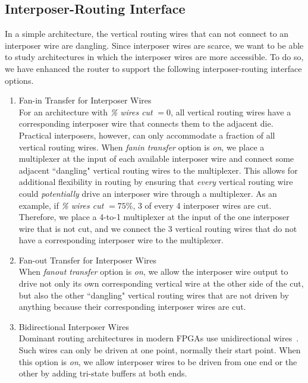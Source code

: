 \documentclass[journal]{IEEEtran}
\begin{document}
\subsection{Interposer-Routing Interface}
\label{sec:interposer-routing-interface}
In a simple architecture, the vertical routing wires that can not connect to an interposer wire are dangling. Since interposer wires are scarce, we want to be able to study architectures in which the interposer wires are more accessible. To do so, we have enhanced the router to support the following interposer-routing interface options.

\begin{enumerate}
\item Fan-in Transfer for Interposer Wires\\
For an architecture with \textit{\% wires cut} $=0$, all vertical routing wires have a corresponding interposer wire that connects them to the adjacent die. Practical interposers, however, can only accommodate a fraction of all vertical routing wires. When \textit{fanin transfer} option is \textit{on}, we place a multiplexer at the input of each available interposer wire and connect some adjacent ``dangling" vertical routing wires to the multiplexer. This allows for additional flexibility in routing by ensuring that \textit{every} vertical routing wire could \textit{potentially} drive an interposer wire through a multiplexer. As an example, if \textit{\% wires cut} $=75\%$, 3 of every 4 interposer wires are cut. Therefore, we place a 4-to-1 multiplexer at the input of the one interposer wire that is not cut, and we connect the 3 vertical routing wires that do not have a corresponding interposer wire to the multiplexer. 

\item Fan-out Transfer for Interposer Wires\\
When \textit{fanout transfer} option is \textit{on}, we allow the interposer wire output to drive not only its own corresponding vertical wire at the other side of the cut, but also the other ``dangling" vertical routing wires that are not driven by anything because their corresponding interposer wires are cut.

\item Bidirectional Interposer Wires\\
Dominant routing architectures in modern FPGAs use unidirectional wires~\cite{unidirectional, lewis2005stratix}. Such wires can only be driven at one point, normally their start point. When this option is \textit{on}, we allow interposer wires to be driven from one end or the other by adding tri-state buffers at both ends.
\end{enumerate}
\end{document}
